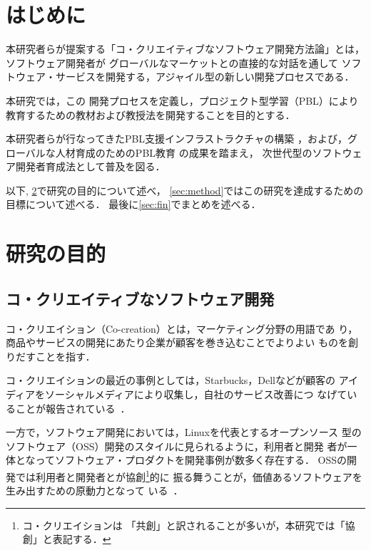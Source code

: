\documentclass[a4j,twoside]{jarticle}
\begin{document}
\renewcommand{\thefootnote}{*\arabic{footnote}}
\setcounter{footnote}{0}
\begin{multicols}{2} %
\small %

\section{はじめに}

	本研究者らが提案する「コ・クリエイティブなソフトウェア開発方法論」とは，ソフトウェア開発者が
	グローバルなマーケットとの直接的な対話を通して
	ソフトウェア・サービスを開発する，アジャイル型の新しい開発プロセスである．
	
	本研究では，この
	開発プロセスを定義し，プロジェクト型学習（PBL）により教育するための教材および教授法を開発することを目的とする．

	本研究者らが行なってきたPBL支援インフラストラクチャの構築
	\cite{pub:chubachi-ipbl-2012}\cite{pub:chubachi-ipbl-2011}%
	\cite{pub:chubachi-ipbl-2009b}\cite{pub:chubachi-ipbl-2009a}%
	，および，グローバルな人材育成のためのPBL教育
	\cite{pub:chubachi-global-2010}\cite{pub:nishino-2010}%
	の成果を踏まえ，
	次世代型のソフトウェア開発者育成法として普及を図る．
	
	以下,
	\ref{sec:purpose}で研究の目的について述べ，
	\ref{sec:method}ではこの研究を達成するための目標について述べる．
	最後に\ref{sec:fin}でまとめを述べる．
	
\section{研究の目的}\label{sec:purpose}
\subsection{コ・クリエイティブなソフトウェア開発}

    コ・クリエイション（Co-creation）とは，マーケティング分野の用語であ
    り，商品やサービスの開発にあたり企業が顧客を巻き込むことでよりよい
    ものを創りだすことを指す．
    
    コ・クリエイションの最近の事例としては，Starbucks，Dellなどが顧客の
    アイディアをソーシャルメディアにより収集し，自社のサービス改善につ
    なげていることが報告されている~\cite{wired}．

    一方で，ソフトウェア開発においては，Linuxを代表とするオープンソース
    型のソフトウェア（OSS）開発のスタイルに見られるように，利用者と開発
    者が一体となってソフトウェア・プロダクトを開発事例が数多く存在する．
    OSSの開発では利用者と開発者とが協創\footnote{コ・クリエイションは
    「共創」と訳されることが多いが，本研究では「協創」と表記する．}的に
    振る舞うことが，価値あるソフトウェアを生み出すための原動力となって
    いる~\cite{oss}．
    

\end{multicols}
\end{document}
